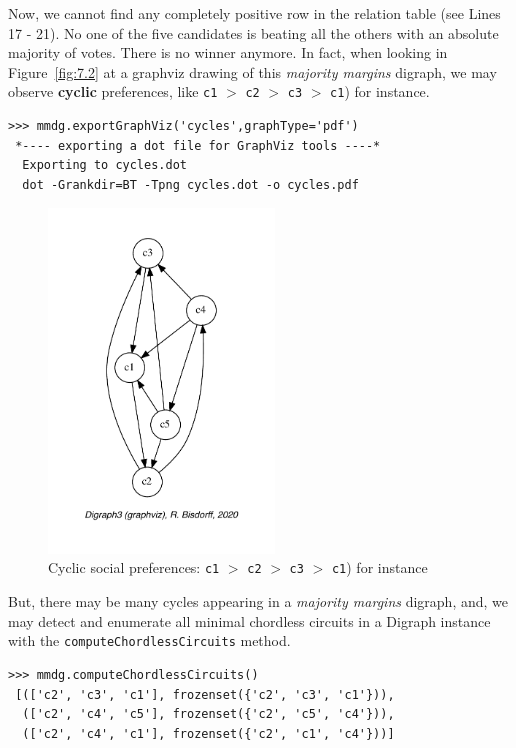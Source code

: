 Now, we cannot find any completely positive row in the relation table (see Lines 17 - 21). No one of the five candidates is beating all the others with an absolute majority of votes. There is no \Condorcet winner anymore. In fact, when looking in Figure~\vref{fig:7.2} at a graphviz drawing of this \emph{majority margins} digraph, we may observe \textbf{cyclic} preferences, like \texttt{c1} $>$ \texttt{c2} $>$ \texttt{c3} $>$ \texttt{c1}) for instance.
\begin{lstlisting}
>>> mmdg.exportGraphViz('cycles',graphType='pdf')
 *---- exporting a dot file for GraphViz tools ----*
  Exporting to cycles.dot
  dot -Grankdir=BT -Tpng cycles.dot -o cycles.pdf
\end{lstlisting}
\begin{figure}[h]
\sidecaption[t]
\includegraphics[width=6cm]{Figures/7-2-cycles.pdf}
\caption{Cyclic social preferences: \texttt{c1} $>$ \texttt{c2} $>$ \texttt{c3} $>$ \texttt{c1}) for instance}
\label{fig:7.2}       %
\end{figure}
	   
But, there may be many cycles appearing in a \emph{majority margins} digraph, and, we may detect and enumerate all minimal chordless circuits in a Digraph instance with the \texttt{computeChordlessCircuits} method.
\begin{lstlisting}
>>> mmdg.computeChordlessCircuits()
 [(['c2', 'c3', 'c1'], frozenset({'c2', 'c3', 'c1'})), 
  (['c2', 'c4', 'c5'], frozenset({'c2', 'c5', 'c4'})), 
  (['c2', 'c4', 'c1'], frozenset({'c2', 'c1', 'c4'}))]
\end{lstlisting}

